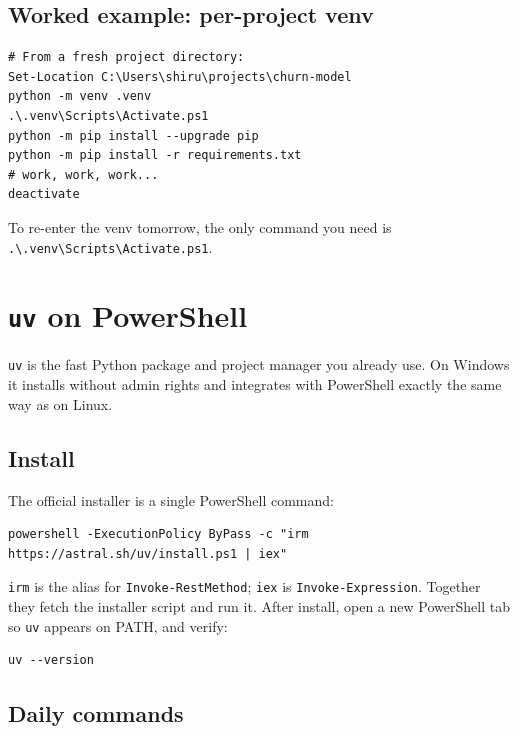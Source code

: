\documentclass[11pt,a4paper]{article}
\newcommand{\cmd}[1]{\texttt{\textcolor{pwshKw}{#1}}}
\begin{document}
\subsection*{Worked example: per-project venv}

\begin{lstlisting}[style=pwshstyle]
# From a fresh project directory:
Set-Location C:\Users\shiru\projects\churn-model
python -m venv .venv
.\.venv\Scripts\Activate.ps1
python -m pip install --upgrade pip
python -m pip install -r requirements.txt
# work, work, work...
deactivate
\end{lstlisting}

To re-enter the venv tomorrow, the only command you need is
\texttt{.\textbackslash{}.venv\textbackslash{}Scripts\textbackslash{}Activate.ps1}.

\section{\texttt{uv} on PowerShell}

\texttt{uv} is the fast Python package and project manager you
already use. On Windows it installs without admin rights and
integrates with PowerShell exactly the same way as on Linux.

\subsection*{Install}

The official installer is a single PowerShell command:

\begin{lstlisting}[style=pwshstyle]
powershell -ExecutionPolicy ByPass -c "irm https://astral.sh/uv/install.ps1 | iex"
\end{lstlisting}

\texttt{irm} is the alias for \cmd{Invoke-RestMethod}; \texttt{iex}
is \cmd{Invoke-Expression}. Together they fetch the installer script
and run it. After install, open a new PowerShell tab so \texttt{uv}
appears on PATH, and verify:

\begin{lstlisting}[style=pwshstyle]
uv --version
\end{lstlisting}

\subsection*{Daily commands}
\end{document}
